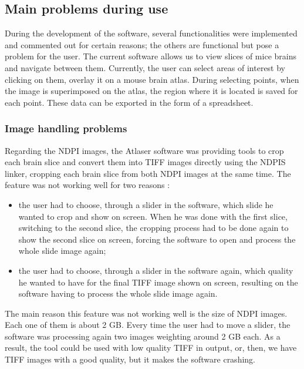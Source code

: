 \documentclass[a4paper,12pt]{report}
\begin{document}
\subsection{Main problems during use}
During the development of the software, several functionalities were implemented and commented out for certain reasons; the others are functional but pose a problem for the user. The current software allows us to view slices of mice brains and navigate between them. Currently, the user can select areas of interest by clicking on them, overlay it on a mouse brain atlas. During selecting points, when the image is superimposed on the atlas, the region where it is located is saved for each point. These data can be exported in the form of a spreadsheet.\\

\subsubsection{Image handling problems}
Regarding the NDPI images, the Atlaser software was providing tools to crop each brain slice and convert them into TIFF images directly using the NDPIS linker, cropping each brain slice from both NDPI images at the same time. The feature was not working well for two reasons : \begin{itemize}
    \item the user had to choose, through a slider in the software, which slide he wanted to crop and show on screen. When he was done with the first slice, switching to the second slice, the cropping process had to be done again to show the second slice on screen, forcing the software to open and process the whole slide image again;
    \item the user had to choose, through a slider in the software again, which quality he wanted to have for the final TIFF image shown on screen, resulting on the software having to process the whole slide image again.
\end{itemize}
The main reason this feature was not working well is the size of NDPI images. Each one of them is about 2 GB. Every time the user had to move a slider, the software was processing again two images weighting around 2 GB each. As a result, the tool could be used with low quality TIFF in output, or, then, we have TIFF images with a good quality, but it makes the software crashing.\\ 
\end{document}
